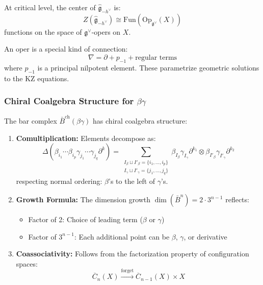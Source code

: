 \begin{theorem}\label{thm:ff-center}
At critical level, the center of $\widehat{\mathfrak{g}}_{-h^\vee}$ is:
\[
Z(\widehat{\mathfrak{g}}_{-h^\vee}) \cong \mathrm{Fun}(\mathrm{Op}_{\mathfrak{g}^\vee}(X))
\]
functions on the space of $\mathfrak{g}^\vee$-opers on $X$.
\end{theorem}

\begin{remark}
An oper is a special kind of connection:
\[
\nabla = \partial + p_{-1} + \text{regular terms}
\]
where $p_{-1}$ is a principal nilpotent element. These parametrize geometric solutions 
to the KZ equations.
\end{remark}

\subsubsection{Chiral Coalgebra Structure for $\beta\gamma$}

\begin{theorem}\label{thm:bg-bar-coalg}
The bar complex $\bar{B}^{\text{ch}}(\beta\gamma)$ has chiral coalgebra structure:
\begin{enumerate}
\item \textbf{Comultiplication:} Elements decompose as:
\[
\Delta(\beta_{i_1} \cdots \beta_{i_p} \gamma_{j_1} \cdots \gamma_{j_q} \partial^k) = 
\sum_{\substack{I_\beta \sqcup I'_\beta = \{i_1,\ldots,i_p\} \\ I_\gamma \sqcup I'_\gamma = \{j_1,\ldots,j_q\}}} 
\beta_{I_\beta}\gamma_{I_\gamma}\partial^{k_1} \otimes \beta_{I'_\beta}\gamma_{I'_\gamma}\partial^{k_2}
\]
respecting normal ordering: $\beta$'s to the left of $\gamma$'s.

\item \textbf{Growth Formula:} The dimension growth $\dim(\bar{B}^n) = 2 \cdot 3^{n-1}$ reflects:
\begin{itemize}
\item Factor of 2: Choice of leading term ($\beta$ or $\gamma$)
\item Factor of $3^{n-1}$: Each additional point can be $\beta$, $\gamma$, or derivative
\end{itemize}

\item \textbf{Coassociativity:} Follows from the factorization property of configuration spaces:
\[
\overline{C}_{n}(X) \xrightarrow{\text{forget}} \overline{C}_{n-1}(X) \times X
\]
\end{enumerate}
\end{theorem}

